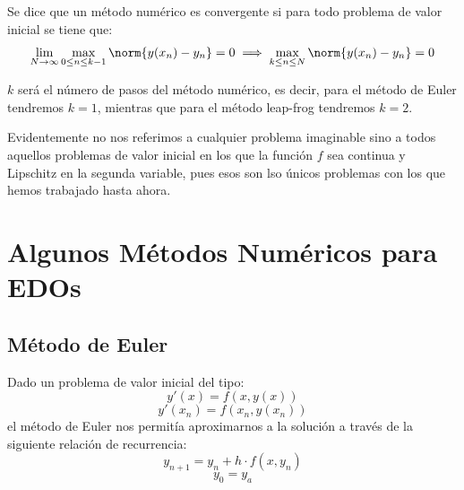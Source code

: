 \documentclass{apuntes}
\begin{document}
\begin{defn}
Se dice que un método numérico es convergente si para todo problema de valor inicial se tiene que:
\[\lim_{N \to \infty} \max_{0 \leq n \leq k-1}\norm{y(x_n)-y_n}= 0\implies \max_{k \leq n \leq N} \norm{y(x_n)-y_n}=0\]

$k$ será el número de pasos del método numérico, es decir, para el método de Euler tendremos $k=1$, mientras que para el método leap-frog tendremos $k=2$.

Evidentemente no nos referimos a cualquier problema imaginable sino a todos aquellos problemas de valor inicial en los que la función $f$ sea continua y Lipschitz en la segunda variable, pues esos son lso únicos problemas con los que hemos trabajado hasta ahora.
\end{defn}

\chapter{Algunos Métodos Numéricos para EDOs}
\section{Método de Euler}

Dado un problema de valor inicial del tipo:
\[y'(x) = f(x,y(x))\]
\[y'(x_n) = f(x_n,y(x_n))\]
el método de Euler nos permitía aproximarnos a la solución a través de la siguiente relación de recurrencia:
\[y_{n+1} = y_n + h·f(x,y_n)\]
\[y_0=y_a\]
\end{document}
